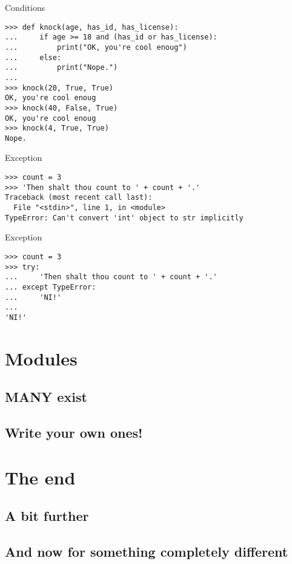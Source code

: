 \documentclass[ignorenonframetext,]{beamer}
\begin{document}
\begin{frame}[fragile]{Conditions}
    \begin{verbatim}
>>> def knock(age, has_id, has_license):
...     if age >= 18 and (has_id or has_license):
...         print("OK, you're cool enoug")
...     else:
...         print("Nope.")
...
>>> knock(20, True, True)
OK, you're cool enoug
>>> knock(40, False, True)
OK, you're cool enoug
>>> knock(4, True, True)
Nope.
    \end{verbatim}
\end{frame}

\begin{frame}[fragile]{Exception}
    \begin{verbatim}
>>> count = 3
>>> 'Then shalt thou count to ' + count + '.'
Traceback (most recent call last):
  File "<stdin>", line 1, in <module>
TypeError: Can't convert 'int' object to str implicitly
    \end{verbatim}
\end{frame}

\begin{frame}[fragile]{Exception}
    \begin{verbatim}
>>> count = 3
>>> try:
...     'Then shalt thou count to ' + count + '.'
... except TypeError:
...     'NI!'
...
'NI!'
    \end{verbatim}
\end{frame}

\section{Modules}
\subsection{MANY exist}
\subsection{Write your own ones!}

\section{The end}
\subsection{A bit further}
\subsection{And now for something completely different}
\end{document}
